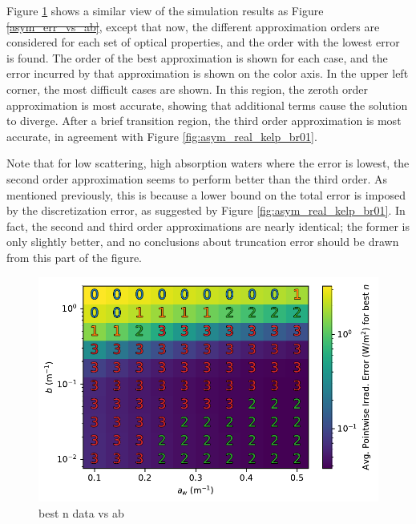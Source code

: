 \documentclass[ms,cpyr,lof,lot]{uathesis}
\providecommand{\DIFadd}[1]{{\protect\color{blue}\uwave{#1}}} %
\providecommand{\DIFdel}[1]{{\protect\color{red}\sout{#1}}}                      %
\providecommand{\DIFaddbegin}{} %
\providecommand{\DIFaddend}{} %
\providecommand{\DIFdelbegin}{} %
\providecommand{\DIFdelend}{} %
\newcommand{\DIFscaledelfig}{0.5}
\newlength{\DIFdelgraphicswidth} %
\newlength{\DIFdelgraphicsheight} %
\newcommand{\DIFaddincludegraphics}[2][]{{\color{blue}\fbox{\DIFOincludegraphics[#1]{#2}}}} %
\newcommand{\DIFdelincludegraphics}[2][]{%
\sbox{\DIFdelgraphicsbox}{\DIFOincludegraphics[#1]{#2}}%
\settoboxwidth{\DIFdelgraphicswidth}{\DIFdelgraphicsbox} %
\settoboxtotalheight{\DIFdelgraphicsheight}{\DIFdelgraphicsbox} %
\scalebox{\DIFscaledelfig}{%
\parbox[b]{\DIFdelgraphicswidth}{\usebox{\DIFdelgraphicsbox}\\[-\baselineskip] \rule{\DIFdelgraphicswidth}{0em}}\llap{\resizebox{\DIFdelgraphicswidth}{\DIFdelgraphicsheight}{%
\setlength{\unitlength}{\DIFdelgraphicswidth}%
\begin{picture}(1,1)%
\thicklines\linethickness{2pt} %
{\color[rgb]{1,0,0}\put(0,0){\framebox(1,1){}}}%
{\color[rgb]{1,0,0}\put(0,0){\line( 1,1){1}}}%
{\color[rgb]{1,0,0}\put(0,1){\line(1,-1){1}}}%
\end{picture}%
}\hspace*{3pt}}} %
} %
\DeclareRobustCommand{\DIFaddbegin}{\DIFOaddbegin \let\includegraphics\DIFaddincludegraphics} %
\DeclareRobustCommand{\DIFaddend}{\DIFOaddend \let\includegraphics\DIFOincludegraphics} %
\DeclareRobustCommand{\DIFdelbegin}{\DIFOdelbegin \let\includegraphics\DIFdelincludegraphics} %
\DeclareRobustCommand{\DIFdelend}{\DIFOaddend \let\includegraphics\DIFOincludegraphics} %
\begin{document}
Figure \ref{fig:best_n_data_vs_ab} shows a similar view of the simulation results as Figure \DIFdelbegin \DIFdel{\ref{asym_err_vs_ab}}\DIFdelend \DIFaddbegin \DIFadd{\ref{fig:asym_err_vs_ab}}\DIFaddend , except that now, the different approximation orders are considered for each set of optical properties, and the order with the lowest error is found.
The order of the best approximation is shown for each case, and the error incurred by that approximation is shown on the color axis.
In the upper left corner, the most difficult cases are shown.
In this region, the zeroth order approximation is most accurate, showing that additional terms cause the solution to diverge.
After a brief transition region, the third order approximation is most accurate, in agreement with Figure \ref{fig:asym_real_kelp_br01}.

Note that for low scattering, high absorption waters where the error is lowest, the second order approximation seems to perform better than the third order.
As mentioned previously, this is because a lower bound on the total error is imposed by the discretization error, as suggested by Figure \ref{fig:asym_real_kelp_br01}.
In fact, the second and third order approximations are nearly identical; the former is only slightly better, and no conclusions about truncation error should be drawn from this part of the figure.

\begin{figure}[H]
  \centering
  \includegraphics[width=\rdfigwidth]{best_n_data_vs_ab}
  \caption{best n data vs ab}
  \label{fig:best_n_data_vs_ab}
\end{figure}
\end{document}
